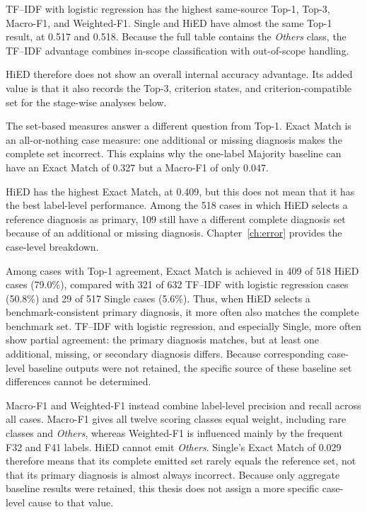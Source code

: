 \documentclass[12pt,a4paper,oneside]{report}
\begin{document}
TF--IDF with logistic regression has the highest same-source Top-1,
Top-3, Macro-F1, and Weighted-F1. Single and HiED have almost the same
Top-1 result, at 0.517 and 0.518. Because the full table contains the
\emph{Others} class, the TF--IDF advantage combines in-scope
classification with out-of-scope handling.

HiED therefore does not show an overall internal accuracy advantage.
Its added value is that it also records the Top-3, criterion states, and
criterion-compatible set for the stage-wise analyses below.

The set-based measures answer a different question from Top-1.
Exact Match is an all-or-nothing case measure: one additional or
missing diagnosis makes the complete set incorrect. This explains why
the one-label Majority baseline can have an Exact Match of 0.327 but a
Macro-F1 of only 0.047.

HiED has the highest Exact Match, at 0.409, but this does not mean that
it has the best label-level performance. Among the 518 cases in which
HiED selects a reference diagnosis as primary, 109 still have a
different complete diagnosis set because of an additional or missing
diagnosis. Chapter~\ref{ch:error} provides the case-level breakdown.

Among cases with Top-1 agreement, Exact Match is achieved in 409 of
518 HiED cases (79.0\%), compared with 321 of 632 TF--IDF with
logistic regression cases (50.8\%) and 29 of 517 Single cases
(5.6\%). Thus, when HiED selects a benchmark-consistent primary
diagnosis, it more often also matches the complete benchmark set.
TF--IDF with logistic regression, and especially Single, more often
show partial agreement: the primary diagnosis matches, but at least
one additional, missing, or secondary diagnosis differs. Because
corresponding case-level baseline outputs were not retained, the
specific source of these baseline set differences cannot be
determined.

Macro-F1 and Weighted-F1 instead combine label-level precision and
recall across all cases. Macro-F1 gives all twelve scoring classes equal
weight, including rare classes and \emph{Others}, whereas Weighted-F1
is influenced mainly by the frequent F32 and F41 labels. HiED cannot
emit \emph{Others}. Single's Exact Match of 0.029 therefore means that
its complete emitted set rarely equals the reference set, not that its
primary diagnosis is almost always incorrect. Because only aggregate
baseline results were retained, this thesis does not assign a more
specific case-level cause to that value.
\end{document}
